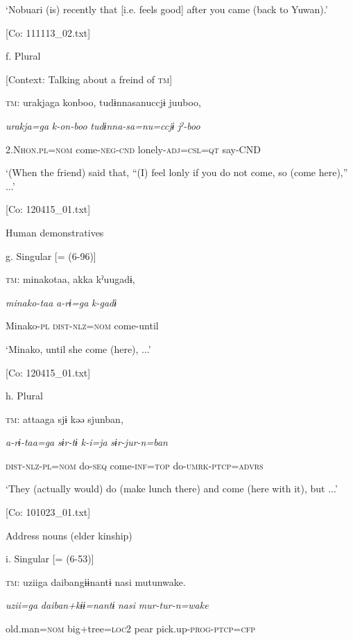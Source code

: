       ‘Nobuari (is) recently that [i.e. feels good] after you came (back to Yuwan).’

      [Co: 111113\_02.txt]

  f.  Plural

    [Context: Talking about a freind of \textsc{tm}]

    \textsc{tm}:  urakjaga  konboo,  tudɨnnasanuccjɨ  juuboo,

      \textit{urakja=ga}  \textit{k-on-boo}  \textit{tudɨnna-sa=nu=ccjɨ}  \textit{jˀ-boo}

      2.N\textsc{hon}.\textsc{pl}=\textsc{nom}  come-\textsc{neg}-\textsc{cnd}  lonely-\textsc{adj}=\textsc{csl}=\textsc{qt}  say-CND

      ‘(When the friend) said that, “(I) feel lonly if you do not come, so (come here),” ...’

      [Co: 120415\_01.txt]

  Human demonstratives

  g.  Singular [= (6-96)]

    \textsc{tm}:  minakotaa,  akka  kˀuugadɨ,

      \textit{minako-taa}  \textit{a-rɨ=ga}  \textit{k-gadɨ}

      Minako-\textsc{pl}  \textsc{dist}-\textsc{nlz}=\textsc{nom}  come-until

      ‘Minako, until she come (here), ...’

      [Co: 120415\_01.txt]

  h.  Plural

    \textsc{tm}:  attaaga  sjɨ  kəə  sjunban,

      \textit{a-rɨ-taa=ga}  \textit{sɨr-tɨ}  \textit{k-i=ja}  \textit{sɨr-jur-n=ban}

      \textsc{dist}-\textsc{nlz}-\textsc{pl}=\textsc{nom}  do-\textsc{seq}  come-\textsc{inf}=\textsc{top}  do-\textsc{umrk}-\textsc{ptcp}=\textsc{advrs}

      ‘They (actually would) do (make lunch there) and come (here with it), but ...’

      [Co: 101023\_01.txt]

  Address nouns (elder kinship)

  i.  Singular [= (6-53)]

    \textsc{tm}:  uziiga  daibangɨɨnantɨ  nasi  mutunwake.

      \textit{uzii=ga}  \textit{daiban+kɨɨ=nantɨ}  \textit{nasi}  \textit{mur-tur-n=wake}

      old.man=\textsc{nom}  big+tree=\textsc{loc}2  pear  pick.up-\textsc{prog}-\textsc{ptcp}=\textsc{cfp}

